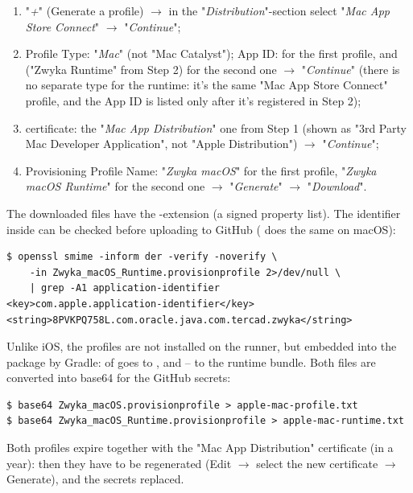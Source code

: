 \begin{enumerate}
  \item "\emph{+}" (Generate a profile) $\rightarrow$ in the "\emph{Distribution}"-section select "\emph{Mac App Store
  Connect}" $\rightarrow$ "\emph{Continue}";
  \item Profile Type: "\emph{Mac}" (not "Mac Catalyst"); App ID:  for the first profile, and
   ("Zwyka Runtime" from Step 2) for the second one $\rightarrow$
  "\emph{Continue}" (there is no separate type for the runtime: it's the same "Mac App Store Connect" profile, and the
  App ID is listed only after it's registered in Step 2);
  \item certificate: the "\emph{Mac App Distribution}" one from Step 1 (shown as "3rd Party Mac Developer
  Application", not "Apple Distribution") $\rightarrow$ "\emph{Continue}";
  \item Provisioning Profile Name: "\emph{Zwyka macOS}" for the first profile, "\emph{Zwyka macOS Runtime}" for the
  second one $\rightarrow$ "\emph{Generate}" $\rightarrow$ "\emph{Download}".
\end{enumerate}

\noindent The downloaded files have the -extension (a signed property list). The identifier inside
can be checked before uploading to GitHub ( does the same on macOS):

\begin{lstlisting}[language=terminal]
$ openssl smime -inform der -verify -noverify \
    -in Zwyka_macOS_Runtime.provisionprofile 2>/dev/null \
    | grep -A1 application-identifier
<key>com.apple.application-identifier</key>
<string>8PVKPQ758L.com.oracle.java.com.tercad.zwyka</string>
\end{lstlisting}

\noindent Unlike iOS, the profiles are not installed on the runner, but embedded into the package by Gradle:
 of  goes to , and  --
to the runtime bundle. Both files are converted into base64 for the GitHub secrets:

\begin{lstlisting}[language=terminal]
$ base64 Zwyka_macOS.provisionprofile > apple-mac-profile.txt
$ base64 Zwyka_macOS_Runtime.provisionprofile > apple-mac-runtime.txt
\end{lstlisting}

\noindent Both profiles expire together with the "Mac App Distribution" certificate (in a year): then they have to be
regenerated (Edit $\rightarrow$ select the new certificate $\rightarrow$ Generate), and the secrets replaced.


